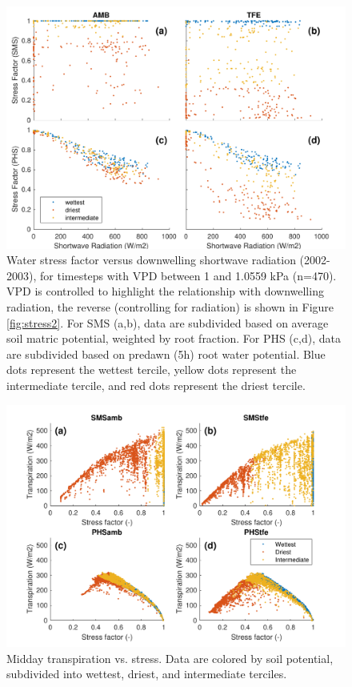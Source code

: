 \documentclass[draft,linenumbers]{agujournal}
\begin{document}
      \begin{figure}[h]
     \centering
     \includegraphics[width=30pc]{../figs3/suppstress.pdf}
     \caption{Water stress factor versus downwelling shortwave radiation (2002-2003), for timesteps with VPD between 1 and 1.0559 kPa (n=470).
     VPD is controlled to highlight the relationship with downwelling radiation, the reverse (controlling for radiation) is shown in Figure \ref{fig:stress2}.
     For SMS (a,b), data are subdivided based on average soil matric potential, weighted by root fraction.
     For PHS (c,d), data are subdivided based on predawn (5h) root water potential.
     Blue dots represent the wettest tercile, yellow dots represent the intermediate tercile, and red dots represent the driest tercile.
     }
     \label{supp:fsds}
       \end{figure}
         \clearpage

  \begin{figure}[h]
     \centering
     \includegraphics[width=30pc]{../figs3/supptstress.pdf}
     \caption{Midday transpiration vs. stress. 
     Data are colored by soil potential, subdivided into wettest, driest, and intermediate terciles.}
     \label{supp:tstress}
  \end{figure}
  \clearpage
\end{document}
